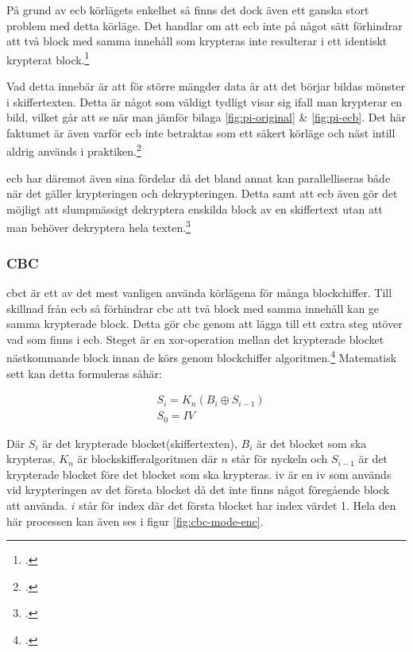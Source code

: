 På grund av \acrshort{ecb} körlägets enkelhet så finns det dock även ett ganska
stort problem med detta körläge. Det handlar om att \acrshort{ecb} inte på något
sätt förhindrar att två block med samma innehåll som krypteras inte resulterar i
ett identiskt krypterat block.\footcite{dworkin2001sp}

Vad detta innebär är att för större mängder data
är att det börjar bildas mönster i skiffertexten. Detta är något som väldigt
tydligt visar sig ifall man krypterar en bild, vilket går att se när man jämför
bilaga \ref{fig:pi-original} \& \ref{fig:pi-ecb}.
Det här faktumet är även varför \acrshort{ecb} inte betraktas som ett säkert körläge
och näst intill aldrig används i praktiken.\footcite{dworkin2001sp}

\acrshort{ecb} har däremot även sina fördelar då det bland annat kan parallelliseras
både när det gäller krypteringen och dekrypteringen. Detta samt att \acrshort{ecb}
även gör det möjligt att slumpmässigt dekryptera enskilda block av en skiffertext
utan att man behöver dekryptera hela texten.\footcite{dworkin2001sp}

\subsubsection{CBC}
\label{sec:cbc}
\acrlong{cbc}t är ett av det mest vanligen använda körlägena för många blockchiffer.
Till skillnad från \acrshort{ecb} så förhindrar \acrshort{cbc} att två block med
samma innehåll kan ge samma krypterade block. Detta gör \acrshort{cbc} genom att
lägga till ett extra steg utöver vad som finns i \acrshort{ecb}. Steget
är en \gls{xor}-operation mellan det krypterade blocket nästkommande block innan
de körs genom blockchiffer algoritmen.\footcite{dworkin2001sp}
Matematisk sett kan detta formuleras såhär:

\begin{equation}
    \label{eq:cbc-encryption}
    \begin{aligned}
        &S_i = K_n(B_i \oplus S_{i-1})\\\nonumber
        &S_0 = IV
    \end{aligned}
\end{equation}

Där $S_i$ är det krypterade blocket(skiffertexten), $B_i$ är det blocket som ska krypteras,
$K_n$ är blockskifferalgoritmen där $n$ står för nyckeln och $S_{i-1}$ är
det krypterade blocket före det blocket som ska krypteras. \acrshort{iv} är en
\acrfull{iv} som används vid krypteringen av det första blocket då det inte finns
något föregående block att använda. $i$ står för index där det första blocket har
index värdet 1. Hela den här processen kan även ses i figur \ref{fig:cbc-mode-enc}.

